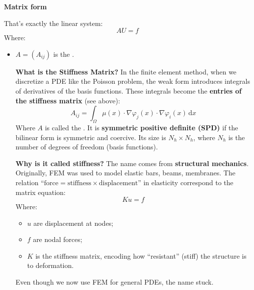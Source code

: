 \newpage

\begin{flushleft}
    \textcolor{Green3}{ \textbf{Matrix form}}
\end{flushleft}
That's exactly the linear system:
\begin{equation}
    A U = f
\end{equation}
Where:
\begin{itemize}
    \item $A = \left(A_{ij}\right)$ is the .

    \textcolor{Green3}{ \textbf{What is the Stiffness Matrix?}} In the finite element method, when we discretize a PDE like the Poisson problem, the weak form introduces integrals of derivatives of the basis functions. These integrals become the \textbf{entries of the stiffness matrix} (see above):
    \begin{equation*}
        A_{ij} = \displaystyle\int_{\Omega} \mu(x) \cdot \nabla \varphi_j(x) \cdot \nabla \varphi_i(x)\, \mathrm{d}x
    \end{equation*}
    Where $A$ is called the . It is \textbf{symmetric positive definite (SPD)} if the bilinear form is symmetric and coercive. Its size is $N_h \times N_h$, where $N_h$ is the number of degrees of freedom (basis functions).

    \textcolor{Green3}{ \textbf{Why is it called stiffness?}} The name comes from \textbf{structural mechanics}. Originally, FEM was used to model elastic bars, beams, membranes. The relation ``$\text{force} = \text{stiffness} \times \text{displacement}$'' in elasticity correspond to the matrix equation:
    \begin{equation*}
        K u = f
    \end{equation*}
    Where:
    \begin{itemize}
        \item $u$ are displacement at nodes;
        \item $f$ are nodal forces;
        \item $K$ is the stiffness matrix, encoding how ``resistant'' (stiff) the structure is to deformation.
    \end{itemize}
    Even though we now use FEM for general PDEs, the name stuck.


\end{itemize}
